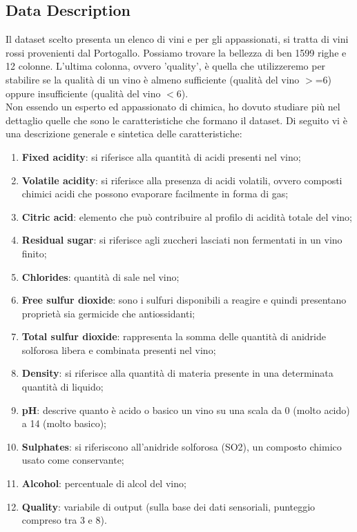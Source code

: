 \documentclass{article}
\begin{document}
\begin{titlepage}
         \subsection{Data Description}
         Il dataset scelto presenta un elenco di vini e per gli appassionati, si tratta di vini rossi provenienti dal Portogallo. Possiamo trovare la bellezza di ben 1599 righe e 12 colonne. L'ultima colonna, ovvero 'quality', è quella che utilizzeremo per stabilire se la qualità di un vino è almeno sufficiente (qualità del vino \( > \)=6) oppure insufficiente (qualità del vino \( < \)6). \\
         Non essendo un esperto ed appassionato di chimica, ho dovuto studiare più nel dettaglio quelle che sono le caratteristiche che formano il dataset. Di seguito vi è una descrizione generale e sintetica delle caratteristiche:
         \begin{enumerate}
            \item \textbf{Fixed acidity}: si riferisce alla quantità di acidi presenti nel vino;
            \item \textbf{Volatile acidity}: si riferisce alla presenza di acidi volatili, ovvero composti chimici acidi che possono evaporare facilmente in forma di gas;
            \item \textbf{Citric acid}: elemento che può contribuire al profilo di acidità totale del vino;
            \item \textbf{Residual sugar}: si riferisce agli zuccheri lasciati non fermentati in un vino finito;
            \item \textbf{Chlorides}: quantità di sale nel vino;
            \item \textbf{Free sulfur dioxide}: sono i sulfuri disponibili a reagire e quindi presentano proprietà sia germicide che antiossidanti;
            \item \textbf{Total sulfur dioxide}: rappresenta la somma delle quantità di anidride solforosa libera e combinata presenti nel vino;
            \item \textbf{Density}: si riferisce alla quantità di materia presente in una determinata quantità di liquido;
            \item \textbf{pH}: descrive quanto è acido o basico un vino su una scala da 0 (molto acido) a 14 (molto basico);
            \item \textbf{Sulphates}: si riferiscono all'anidride solforosa (SO2), un composto chimico usato come conservante;
            \item \textbf{Alcohol}: percentuale di alcol del vino;
            \item \textbf{Quality}: variabile di output (sulla base dei dati sensoriali, punteggio compreso tra 3 e 8). 
         \end{enumerate}


\end{titlepage}
\end{document}
